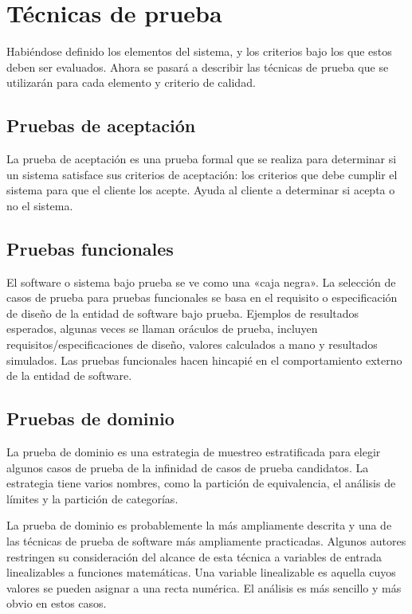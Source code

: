 \section{Técnicas de prueba}
Habiéndose definido los elementos del sistema, y los criterios bajo los que
estos deben ser evaluados. Ahora se pasará a describir las técnicas de prueba
que se utilizarán para cada elemento y criterio de calidad.

\subsection{Pruebas de aceptación}
La prueba de aceptación es una prueba formal que se realiza para determinar si
un sistema satisface sus criterios de aceptación: los criterios que debe cumplir
el sistema para que el cliente los acepte. Ayuda al cliente a determinar si
acepta o no el sistema\cite{Naik}.

\subsection{Pruebas funcionales}
El software o sistema bajo prueba se ve como una «caja negra». La selección de
casos de prueba para pruebas funcionales se basa en el requisito o
especificación de diseño de la entidad de software bajo prueba. Ejemplos de
resultados esperados, algunas veces se llaman oráculos de prueba, incluyen
requisitos/especificaciones de diseño, valores calculados a mano y resultados
simulados. Las pruebas funcionales hacen hincapié en el comportamiento externo
de la entidad de software\cite{Luo}.

\subsection{Pruebas de dominio}
La prueba de dominio es una estrategia de muestreo estratificada para elegir
algunos casos de prueba de la infinidad de casos de prueba candidatos. La
estrategia tiene varios nombres, como la partición de equivalencia, el análisis
de límites y la partición de categorías.

La prueba de dominio es probablemente la más ampliamente descrita y una de las
técnicas de prueba de software más ampliamente practicadas. Algunos autores
restringen su consideración del alcance de esta técnica a variables de entrada
linealizables a funciones matemáticas. Una variable linealizable es aquella
cuyos valores se pueden asignar a una recta numérica. El análisis es más
sencillo y más obvio en estos casos\cite{Kaner}.

